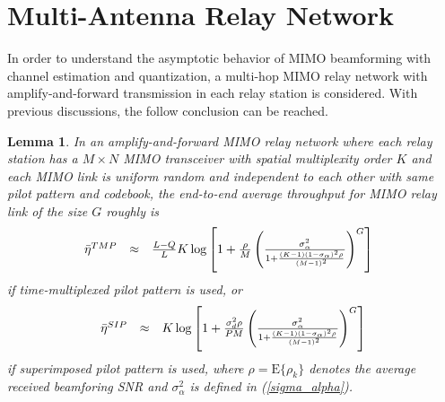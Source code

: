 \documentclass[conference]{IEEEtran}
\newtheorem{lemma}{Lemma}
\begin{document}
\section{Multi-Antenna Relay Network}
In order to understand the asymptotic behavior of MIMO beamforming
with channel estimation and quantization, a multi-hop MIMO relay
network with amplify-and-forward transmission in each relay
station is considered. With previous discussions, the follow
conclusion can be reached.
\begin{lemma}
In an amplify-and-forward MIMO relay network where each relay
station has a $M\times N$ MIMO transceiver with spatial
multiplexity order $K$ and each MIMO link is uniform random and
independent to each other with same pilot pattern and codebook,
the end-to-end average throughput for MIMO relay link of the size
$G$ roughly is
\begin{equation}\hspace{-0.10in}
\begin{array}{rcl}
\bar\eta^{\mbox{\tiny
TMP}}&\approx&\frac{L-Q}{L}K\log\left[1+\frac{\rho}{M}\left(\frac{\sigma_{\alpha}^{2}}{1+\frac{(K-1)(1-\sigma_{\alpha})^2\rho}{(M-1)^2}}\right)^{G}\right]
\end{array}\label{RN_TM}
\end{equation}
\noindent if time-multiplexed pilot pattern is used, or
\begin{equation}%
\begin{array}{rcl}
\bar\eta^{\mbox{\tiny
SIP}}&\approx&K\log\left[1+\frac{\sigma_{d}^{2}\rho}{PM}\left(\frac{\sigma_{\alpha}^{2}}{1+\frac{(K-1)(1-\sigma_{\alpha})^2\rho}{(M-1)^2}}\right)^{G}\right]
\end{array}\label{RN_SI}
\end{equation}
\noindent if superimposed pilot pattern is used, where
$\rho=\mbox{E}\{\rho_{k}\}$ denotes the average received
beamforing SNR and $\sigma_{\alpha}^{2}$ is defined in
(\ref{sigma_alpha}).
\end{lemma}
\begin{figure}
\end{figure}
\end{document}
